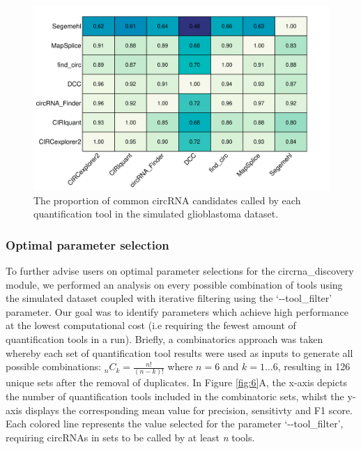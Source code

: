 \documentclass{bmcart}
\begin{document}
\begin{figure}[h!]
    \centering
    \includegraphics[width=12.25cm]{figure5.png}
    \vspace{-10mm}
    \caption{The proportion of common circRNA candidates called by each quantification tool in the simulated glioblastoma dataset. }
    \label{fig:5}
\end{figure}

\subsubsection*{\textbf{Optimal parameter selection}}
To further advise users on optimal parameter selections for the circrna\_discovery module, we performed an analysis on every possible combination of tools using the simulated dataset coupled with iterative filtering using the `-{}-tool\_filter' parameter. Our goal was to identify parameters which achieve high performance at the lowest computational cost (i.e requiring the fewest amount of quantification tools in a run).  Briefly, a combinatorics approach was taken whereby each set of quantification tool results were used as inputs to generate all possible combinations: $ _{n}C_{k} = \frac{n!}{(n-k)!}$ where $n = 6$ and $k = 1 \dots 6$, resulting in 126 unique sets after the removal of duplicates. In Figure \ref{fig:6}A, the x-axis depicts the number of quantification tools included in the combinatoric sets, whilst the y-axis displays the corresponding mean value for precision, sensitivty and F1 score. Each colored line represents the value selected for the parameter `-{}-tool\_filter', requiring circRNAs in sets to be called by at least \textit{n} tools. \par
\end{document}
